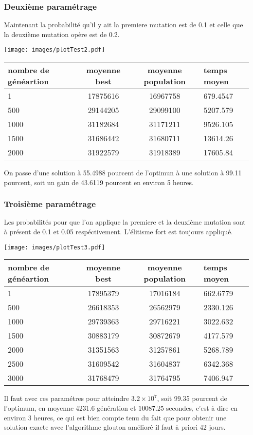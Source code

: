 \documentclass[a4paper]{report}
\begin{document}
\subsubsection*{Deuxième paramétrage}
Maintenant la probabilité qu'il y ait la premiere  mutation est de 0.1  et celle que la deuxième mutation opère est de 0.2.
\begin{center}
\texttt{[image: images/plotTest2.pdf]}
\end{center}
\begin{tabular}{|l|c|c|l|}
  \hline
  nombre de généartion &moyenne best &moyenne population&temps moyen\\

  \hline
 1 &17875616&16967758&679.4547\\
  \hline
500 & 29144205 &  29099100 &5207.579
\\
  \hline
  1000&  31182684&31171211&9526.105
\\
  \hline
  1500 &31686442& 31680711& 13614.26

\\
  \hline
 2000 & 31922579&31918389&17605.84 \\
  \hline


\end{tabular}
On passe d'une solution à 55.4988 pourcent de l'optimun à une solution à 99.11 pourcent, soit un gain de 43.6119 pourcent en environ 5 heures.
\subsubsection*{Troisième paramétrage}
Les probabilités pour que l'on applique la premiere et la deuxième mutation sont à présent de 0.1 et 0.05 respéctivement. L'élitisme fort est toujours appliqué.
\begin{center}
\texttt{[image: images/plotTest3.pdf]}
\end{center}
\begin{tabular}{|l|c|c|l|}
  \hline
  nombre de généartion &moyenne best &moyenne population&temps moyen\\

  \hline
 1 &17895379& 17016184&662.6779\\
  \hline
500 & 26618353  &  26562979 &  2330.126
\\
  \hline
  1000& 29739363& 29716221& 3022.632
\\
  \hline
  1500 & 30883179& 30872679&4177.579

\\
  \hline
 2000 &31351563&31257861&5268.789 \\
  \hline
2500 & 31609542&  31604837& 6342.368\\
\hline
3000 & 31768479 &   31764795&7406.947\\ 
\hline

\end{tabular}
Il faut avec ces paramétres pour atteindre $3.2\times 10^7$, soit 99.35 pourcent de l'optimum, en moyenne 4231.6 génération et 10087.25 secondes, c'est à dire en environ 3 heures, ce qui est bien compte tenu du fait que pour obtenir une solution exacte avec l'algorithme glouton amélioré il faut à priori 42 jours.
\end{document}
